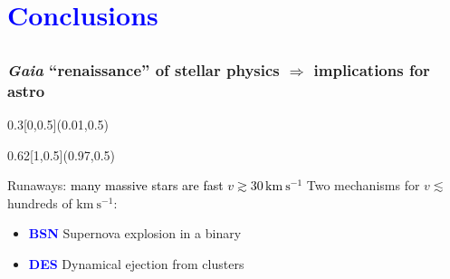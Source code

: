 \documentclass[xcolor=dvipsnames,professionalfonts, aspectratio=169]{beamer}
\begin{document}
\section{\textcolor{Blue}{Conclusions}}
\subsection{}



\begin{frame}
  \frametitle{\emph{Gaia} ``renaissance'' of stellar
    physics $\Rightarrow$ implications for astro}

  \begin{textblock}{0.3}[0,0.5](0.01,0.5)
    \centering
  \\
  \end{textblock}


  \begin{textblock}{0.62}[1,0.5](0.97,0.5)
    \begin{block}{Runaways: \textcolor{black}{\normalfont
          many massive stars are fast $v\gtrsim 30\,\mathrm{km\ s^{-1}}$}}
      Two mechanisms for $v\lesssim$ hundreds of $\mathrm{km\ s^{-1}}$:
      \begin{itemize}
      \item \textcolor{Blue}{\textbf{BSN}} Supernova explosion in a binary
      \item \textcolor{Blue}{\textbf{DES}} Dynamical ejection from clusters
      \end{itemize}
    \end{block}
  \end{textblock}

\end{frame}
\end{document}
